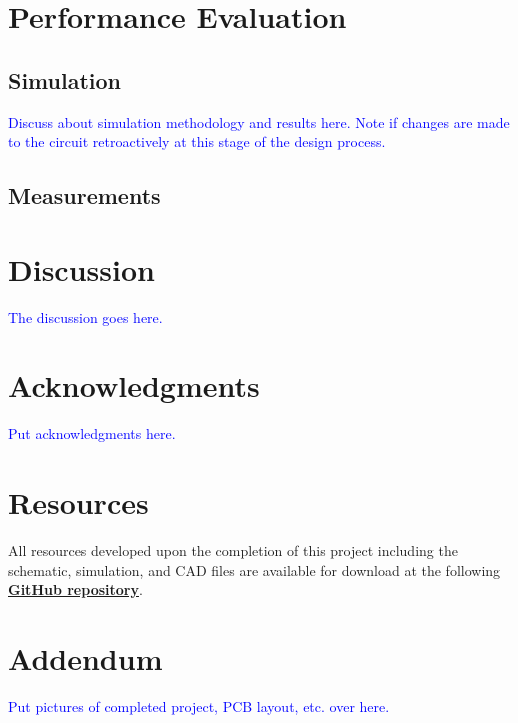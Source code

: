 \documentclass[10pt]{article}
\begin{document}
\begin{multicols*}{2}
        \section{Performance Evaluation}

            \subsection{Simulation}
                \textcolor{blue}{Discuss about simulation methodology and results here. Note if changes are made to the circuit retroactively at this stage of the design process.}

            \subsection{Measurements}
        
        \section{Discussion}
            \textcolor{blue}{The discussion goes here.}

        \section*{Acknowledgments}
            \textcolor{blue}{Put acknowledgments here. }

        \section*{Resources}
            All resources developed upon the completion of this project including the schematic, simulation, and CAD files are available for download at the following \textbf{\textcolor{blue}{\href{https://github.com/ShaunG-RU/DRC-Project}{GitHub repository}}}.

        \printbibliography

    \end{multicols*}

    \newpage

    \section*{Addendum}
        \textcolor{blue}{Put pictures of completed project, PCB layout, etc. over here.}
\end{document}
